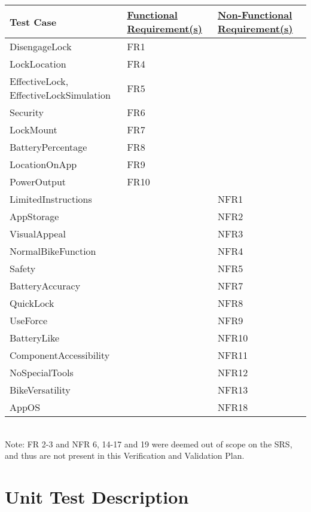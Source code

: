 \documentclass[12pt, titlepage]{article}
\begin{document}
\begin{minipage}{\textwidth}
\footnotesize
{}
\renewcommand*{\arraystretch}{1.5}
\begin{tabular}{| p{} | p{} | p{} |}
 \hline
 Test Case & \href{https://github.com/NevoAbigail/Capstone/blob/main/docs/SRS/SRS.pdf}{Functional Requirement(s)} & \href{https://github.com/NevoAbigail/Capstone/blob/main/docs/SRS/SRS.pdf}{Non-Functional Requirement(s)} \\ 
 \hline
 DisengageLock & FR1 &  \\ 
  \hline
 LockLocation & FR4 &  \\ 
  \hline
 EffectiveLock, EffectiveLockSimulation & FR5 &  \\ 
  \hline
 Security & FR6 &  \\ 
  \hline
 LockMount & FR7 &  \\ 
  \hline
 BatteryPercentage & FR8 &  \\ 
  \hline
 LocationOnApp & FR9 &  \\ 
  \hline
 PowerOutput & FR10 &  \\ 
  \hline
 LimitedInstructions & & NFR1 \\
 \hline
  AppStorage & & NFR2 \\
 \hline
  VisualAppeal & & NFR3 \\
 \hline
  NormalBikeFunction & & NFR4 \\
 \hline
  Safety & & NFR5 \\
 \hline
  BatteryAccuracy & & NFR7 \\
 \hline
  QuickLock & & NFR8 \\
 \hline
 UseForce & & NFR9 \\
 \hline
 BatteryLike & & NFR10 \\
 \hline
  ComponentAccessibility & & NFR11 \\
 \hline
  NoSpecialTools & & NFR12 \\
 \hline
  BikeVersatility & & NFR13 \\
 \hline
  AppOS & & NFR18 \\
 \hline
 \end{tabular}
\end{minipage}\\

Note: FR 2-3 and NFR 6, 14-17 and 19 were deemed out of scope on the SRS, and thus are not present in this Verification and Validation Plan. 

\section{Unit Test Description}
\label{Section 6}
\end{document}
